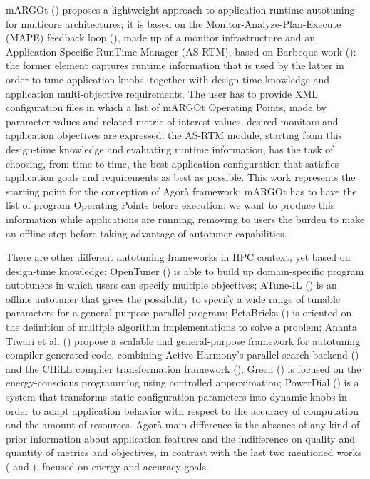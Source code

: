 mARGOt (\cite{gadioli2015application}) proposes a lightweight approach to application runtime autotuning for multicore architectures; it is based on the Monitor-Analyze-Plan-Execute (MAPE) feedback loop (\cite{kephart2003vision}), made up of a monitor infrastructure and an Application-Specific RunTime Manager (AS-RTM), based on Barbeque work \hbox{(\cite{bellasi2012rtrm})}: the former element captures runtime information that is used by the latter in order to tune application knobs, together with design-time knowledge and application multi-objective requirements. The user has to provide XML configuration files in which a list of mARGOt Operating Points, made by parameter values and related metric of interest values, desired monitors and application objectives are expressed; the AS-RTM module, starting from this design-time knowledge and evaluating runtime information, has the task of choosing, from time to time, the best application configuration that satisfies application goals and requirements as best as possible. This work represents the starting point for the conception of Agorà framework; mARGOt has to have the list of program Operating Points before execution: we want to produce this information while applications are running, removing to users the burden to make an offline step before taking advantage of autotuner capabilities.

There are other different autotuning frameworks in HPC context, yet based on design-time knowledge: OpenTuner (\cite{ansel2014opentuner}) is able to build up domain-specific program autotuners in which users can specify multiple objectives; ATune-IL (\cite{schaefer2009atune}) is an offline autotuner that gives the possibility to specify a wide range of tunable parameters for a general-purpose parallel program; PetaBricks (\cite{ansel2009petabricks}) is oriented on the definition of multiple algorithm implementations to solve a problem; Ananta Tiwari et al. (\cite{tiwari2009scalable}) propose a scalable and general-purpose framework for autotuning compiler-generated code, combining Active Harmony's parallel search backend (\cite{chung2004using}) and the CHiLL compiler transformation framework (\cite{chen2008chill}); Green (\cite{baek2010green}) is focused on the energy-conscious programming using controlled approximation; PowerDial (\cite{hoffmann2011dynamic}) is a system that transforms static configuration parameters into dynamic knobs in order to adapt application behavior with respect to the accuracy of computation and the amount of resources. Agorà main difference is the absence of any kind of prior information about application features and the indifference on quality and quantity of metrics and objectives, in contrast with the last two mentioned works (\cite{baek2010green} and \cite{hoffmann2011dynamic}), focused on energy and accuracy goals.

